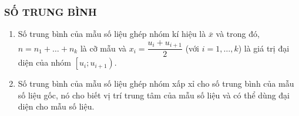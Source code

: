\subsubsection{SỐ TRUNG BÌNH}
\begin{enumerate}[\iconMT]
	\item {} 
		Số trung bình của mẫu số liệu ghép nhóm kí hiệu là $\overline{x}$ và 
		trong đó, $n=n_1+\ldots+n_k$ là cỡ mẫu và $x_i=\dfrac{u_i+u_{i+1}}{2}$ (với $i=1,\ldots,k$) là giá trị đại diện của nhóm $\left[u_i;u_{i+1} \right)$.
	\item {} Số trung bình của mẫu số liệu ghép nhóm xấp xỉ cho số trung bình của mẫu số liệu gốc, nó cho biết vị trí trung tâm của mẫu số liệu và có thể dùng đại diện cho mẫu số liệu. 
\end{enumerate}
